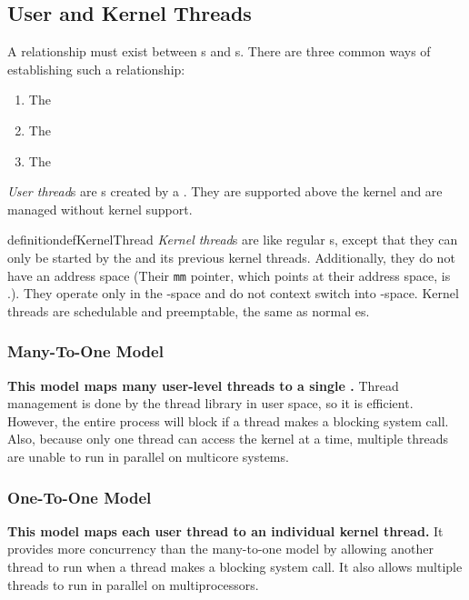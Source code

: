 \subsection{User and Kernel Threads}\label{subsec:User_Kernel_Threads}
A relationship must exist between s and s.
There are three common ways of establishing such a relationship:
\begin{enumerate}[noitemsep]
\item The 
\item The 
\item The 
\end{enumerate}

\begin{definition}\label{def:User_Thread}
  \emph{User thread}s are s created by a  .
  They are supported above the kernel and are managed without kernel support.
\end{definition}

\begin{restatable}{definition}{defKernelThread}\label{def:Kernel_Thread}
  \emph{Kernel thread}s are like regular s, except that they can only be started by the  and its previous kernel threads.
  Additionally, they do not have an address space (Their \texttt{mm} pointer, which points at their address space, is .).
  They operate only in the -space and do not context switch into -space.
  Kernel threads are schedulable and preemptable, the same as normal es.
\end{restatable}

\subsubsection{Many-To-One Model}\label{subsubsec:Many_To_One_Model}
\textbf{This model maps many user-level threads to a single .}
Thread management is done by the thread library in user space, so it is efficient.
However, the entire process will block if a thread makes a blocking system call.
Also, because only one thread can access the kernel at a time, multiple threads are unable to run in parallel on multicore systems.

\subsubsection{One-To-One Model}\label{subsubsec:One_To_One_Model}
\textbf{This model maps each user thread to an individual kernel thread.}
It provides more concurrency than the many-to-one model by allowing another thread to run when a thread makes a blocking system call.
It also allows multiple threads to run in parallel on multiprocessors.

